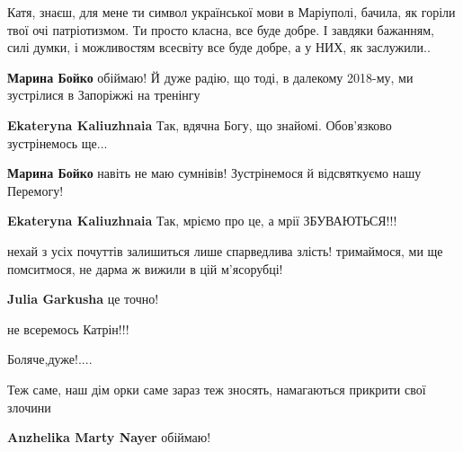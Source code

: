 
Катя, знаєш, для мене ти символ української мови в Маріуполі, бачила, як горіли
твої очі патріотизмом. Ти просто класна, все буде добре. І завдяки бажанням,
силі думки, і можливостям всесвіту все буде добре, а у НИХ, як заслужили..

\begin{itemize} %
\textbf{Марина Бойко} обіймаю! Й дуже радію, що тоді, в далекому 2018-му, ми зустрілися в Запоріжжі на тренінгу 🙏

\textbf{Ekateryna Kaliuzhnaia} Так, вдячна Богу, що знайомі. Обов'язково зустрінемось ще...

\textbf{Марина Бойко} навіть не маю сумнівів! Зустрінемося й відсвяткуємо нашу Перемогу!

\textbf{Ekateryna Kaliuzhnaia} Так, мріємо про це, а мрії ЗБУВАЮТЬСЯ!!!
\end{itemize} %


нехай з усіх почуттів залишиться лише спарведлива злість! тримаймося, ми ще
помситмося, не дарма ж вижили в цій м'ясорубці!

\begin{itemize} %
\textbf{Julia Garkusha} це точно!

не всеремось Катрін!!!
\end{itemize} %


Боляче,дуже!....


Теж саме, наш дім орки саме зараз теж зносять, намагаються прикрити свої злочини

\begin{itemize} %
\textbf{Anzhelika Marty Nayer} обіймаю!
\end{itemize} %
